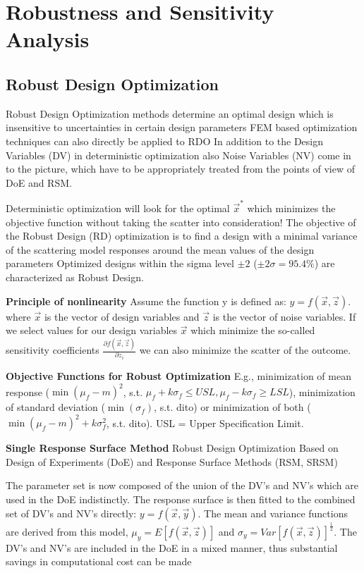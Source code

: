 \section*{Robustness and Sensitivity Analysis}

\subsection*{Robust Design Optimization}
Robust Design Optimization methods determine an optimal design which is insensitive to uncertainties in certain
design parameters
FEM based optimization techniques can also directly be applied to RDO
In addition to the Design Variables (DV) in deterministic optimization also Noise Variables (NV) come in to the picture, which have to be appropriately treated from the points of view of DoE and RSM.

Deterministic optimization will look for the optimal $\vec{x}^*$ which minimizes the objective function without taking the scatter into consideration!
The objective of the Robust Design (RD) optimization is to find a design with a minimal variance of the scattering model responses around the mean values of the design parameters
Optimized designs within the sigma level $\pm 2$ ($\pm 2\sigma = 95.4\%$) are characterized as Robust Design.

\textbf{Principle of nonlinearity}
Assume the function y is defined as: $y=f(\vec{x}, \vec{z})$. where $\vec{x}$ is the vector of design variables and $\vec{z}$ is the vector of noise variables. 
If we select values for our design variables $\vec{x}$ which minimize the so-called sensitivity coefficients $\frac{\partial f(\vec{x}, \vec{z})}{\partial z_i}$ we can also minimize the scatter of the outcome.

\textbf{Objective Functions for Robust Optimization}
E.g., minimization of mean response ($\min(\mu_f - m)^2$, s.t. $\mu_f + k\sigma_f \leq USL, \mu_f - k\sigma_f \geq LSL$), minimization of standard deviation ($\min(\sigma_f)$, s.t. dito) or minimization of both ($\min(\mu_f - m)^2 + k \sigma_f^2$, s.t. dito).
USL = Upper Specification Limit.


\textbf{Single Response Surface Method}
Robust Design Optimization
Based on Design of Experiments (DoE) and Response Surface Methods (RSM, SRSM)

The parameter set is now composed of the union of the DV’s and NV’s which are used in the DoE indistinctly.
The response surface is then fitted to the combined set of DV’s and NV’s directly: $y=f(\vec{x}, \vec{y})$.
The mean and variance functions are derived from this model, 
$\mu_y = E[f(\vec{x},\vec{z})]$ and $\sigma_y = Var[f(\vec{x},\vec{z})]^{\frac{1}{2}}$.
The DV’s and NV’s are included in the DoE in a mixed manner, thus substantial savings in computational cost can be made